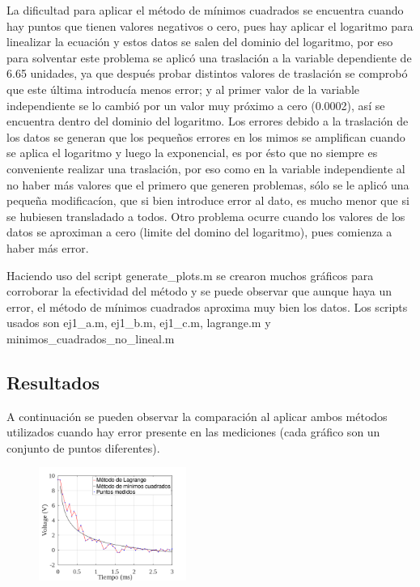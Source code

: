 \documentclass[letterpaper, 10 pt, conference]{ieeeconf}  %
\begin{document}
    La dificultad para aplicar el m\'etodo de m\'inimos cuadrados se encuentra cuando hay puntos que tienen valores negativos o cero, pues hay aplicar el logaritmo para linealizar la ecuaci\'on y estos datos se salen del dominio del logaritmo, por eso para solventar este problema se aplic\'o una traslaci\'on a la variable dependiente de 6.65 unidades, ya que despu\'es probar distintos valores de traslaci\'on se comprob\'o que este \'ultima introduc\'ia menos error; y al primer valor de la variable independiente se lo cambi\'o por un valor muy pr\'oximo a cero (0.0002), as\'i se encuentra dentro del dominio del logaritmo. Los errores debido a la traslaci\'on de los datos se generan que los pequeños errores en los mimos se amplifican cuando se aplica el logaritmo y luego la exponencial, es por \'esto que no siempre es conveniente realizar una traslaci\'on, por eso como en la variable independiente al no haber m\'as valores que el primero que generen problemas, s\'olo se le aplic\'o una pequeña modificac\'ion, que si bien introduce error al dato, es mucho menor que si se hubiesen transladado a todos. Otro problema ocurre cuando los valores de los datos se aproximan a cero (limite del domino del logaritmo), pues comienza a haber m\'as error.

    Haciendo uso del script generate\_plots.m se crearon muchos gr\'aficos para corroborar la efectividad del m\'etodo y se puede observar que aunque haya un error, el m\'etodo de m\'inimos cuadrados aproxima muy bien los datos.
    Los scripts usados son ej1\_a.m, ej1\_b.m, ej1\_c.m, lagrange.m y minimos\_cuadrados\_no\_lineal.m

    \subsection{Resultados}

    A continuaci\'on se pueden observar la comparaci\'on al aplicar ambos m\'etodos utilizados cuando hay error presente en las mediciones (cada gr\'afico son un conjunto de puntos diferentes).

\begin{figure}[H]
\centering
\includegraphics[width=0.43\textwidth]{./plots/ej1-a-plot-0.png}
\label{fig:fig}
\end{figure}
\end{document}

